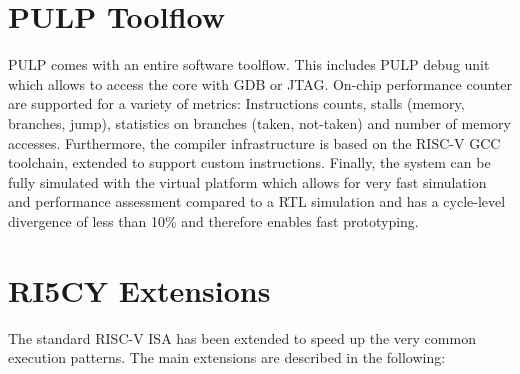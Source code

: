 \section{PULP Toolflow}

PULP comes with an entire software toolflow. This includes PULP debug unit which allows to access the core with GDB or JTAG. On-chip performance counter are supported for a variety of metrics: Instructions counts, stalls (memory, branches, jump), statistics on branches (taken, not-taken) and number of memory accesses. Furthermore, the compiler infrastructure is based on the RISC-V GCC toolchain, extended to support custom instructions. Finally, the system can be fully simulated with the virtual platform which allows for very fast simulation and performance assessment compared to a RTL simulation and has a cycle-level divergence of less than 10\% and therefore enables fast prototyping.


\section{RI5CY Extensions}
The standard RISC-V ISA has been extended to speed up the very common execution patterns. The main extensions are described in the following:

